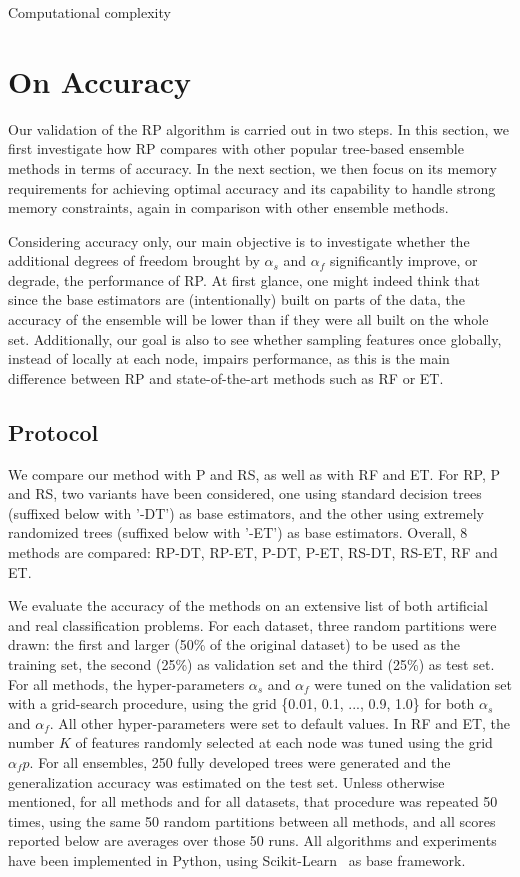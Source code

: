 \begin{remark}{Computational complexity}
\todo{}
\end{remark}

\section{On Accuracy}
\label{sec:9:accuracy}

Our validation of the RP algorithm is carried out in two
steps. In this section, we first investigate how RP compares with
other popular tree-based ensemble methods in terms of accuracy. In the
next section, we then focus on its memory requirements for
achieving optimal accuracy and its capability to handle strong memory
constraints, again in comparison with other ensemble methods.

Considering accuracy only, our main objective is to investigate whether the
additional degrees of freedom brought by $\alpha_s$ and $\alpha_f$ significantly improve,
or degrade, the performance of RP. At first glance, one might indeed think that
since the base estimators are (intentionally) built on parts of the data, the
accuracy of the ensemble will be lower than if they were all built on the whole
set. Additionally, our goal is also to see whether sampling features once
globally, instead of locally at each node, impairs performance, as this is the
main difference between RP and state-of-the-art methods such as RF or ET.

\subsection{Protocol}

We compare our method with P and RS, as well as with RF and ET. For RP, P and
RS, two variants have been considered, one using standard decision trees
(suffixed below with '-DT') as base estimators, and the other using extremely
randomized trees (suffixed below with '-ET') as base estimators.  Overall, 8
methods are compared: RP-DT, RP-ET, P-DT, P-ET, RS-DT, RS-ET, RF and ET.

We evaluate the accuracy of the methods on an extensive list of both
artificial and real classification problems.  For each dataset, three
random partitions were drawn: the first and larger (50\% of the
original dataset) to be used as the training set, the second (25\%) as
validation set and the third (25\%) as test set. For all methods, the
hyper-parameters $\alpha_s$ and $\alpha_f$ were tuned on the validation set with
a grid-search procedure, using the grid \{0.01, 0.1, ..., 0.9, 1.0\}
for both $\alpha_s$ and $\alpha_f$. All other hyper-parameters were set to
default values. In RF and ET, the number $K$ of features randomly
selected at each node was tuned using the grid $\alpha_f p$. For all
ensembles, 250 fully developed trees were generated and the
generalization accuracy was estimated on the test set. Unless
otherwise mentioned, for all methods and for all datasets, that
procedure was repeated 50 times, using the same 50 random partitions
between all methods, and all scores reported below are averages over
those 50 runs. All algorithms and experiments have been implemented in
Python, using Scikit-Learn~\citep{pedregosa:2011} as base framework.

